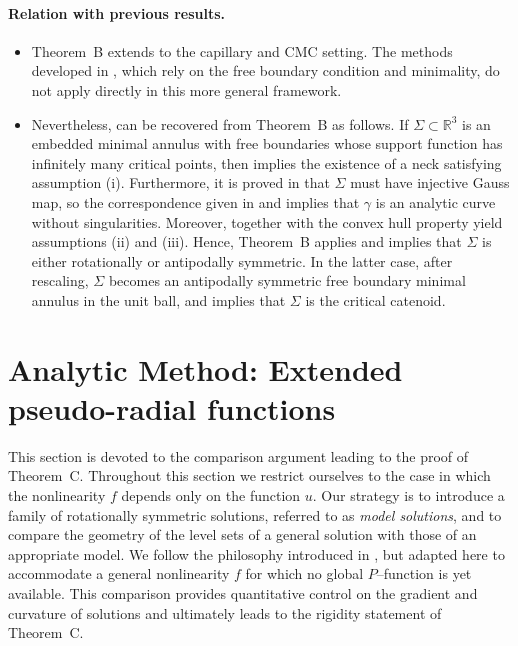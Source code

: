 \documentclass[11pt]{article}
\numberwithin{equation} {section}
\begin{document}
\paragraph{Relation with previous results.}

\begin{itemize}
\item
Theorem~B extends \cite[Theorem~B]{EMa} to the capillary and CMC setting.
The methods developed in \cite{EMa}, which rely on the free boundary condition
and minimality, do not apply directly in this more general framework.

\item
Nevertheless, \cite[Theorem~B]{EMa} can be recovered from Theorem~B as follows.
If $\Sigma \subset \mathbb{R}^3$ is an embedded minimal annulus with free
boundaries whose support function has infinitely many critical points,
then \cite[Claim~E]{EMa} implies the existence of a neck satisfying
assumption {\rm (i)}. Furthermore, it is proved in \cite[Section 6]{EMa} that $\Sigma$ must have injective Gauss map, so the correspondence given in \cite[Proposition 6.1]{EMa} and \cite[Corollary 3.4]{Chr} implies that $\gamma$ is an analytic curve without singularities.
Moreover, \cite[Claim~D]{EMa} together with the convex hull property yield
assumptions {\rm (ii)} and {\rm (iii)}.
Hence, Theorem~B applies and implies that $\Sigma$ is either rotationally or
antipodally symmetric.
In the latter case, after rescaling, $\Sigma$ becomes an antipodally symmetric
free boundary minimal annulus in the unit ball, and
\cite[Theorem~1.1]{KM} implies that $\Sigma$ is the critical catenoid.
\end{itemize}




\section{Analytic Method: Extended pseudo-radial functions}\label{SectAM}
This section is devoted to the comparison argument leading to the proof of
Theorem~C. Throughout this section we restrict ourselves to the case in which
the nonlinearity $f$ depends only on the function $u$.
Our strategy is to introduce a family of rotationally symmetric solutions, referred to as \emph{model solutions}, and to compare the geometry
of the level sets of a general solution with those of an appropriate model. We follow the philosophy introduced in \cite{ABM,EMa}, but 
adapted here to accommodate a general nonlinearity $f$ for which no global
$P$--function is yet available. This comparison provides quantitative control on the gradient and curvature of solutions and ultimately leads to the rigidity statement of Theorem~C.
\end{document}
